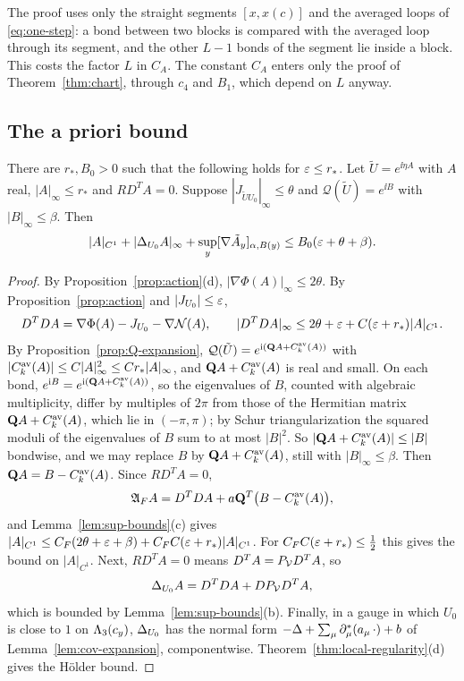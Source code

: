 The proof uses only the straight segments $[x,x(c)]$ and the averaged loops of \eqref{eq:one-step}: a bond between two blocks is compared with the averaged loop through its segment, and the other $L-1$ bonds of the segment lie inside a block. This costs the factor $L$ in $C_A$. The constant $C_A$ enters only the proof of Theorem~\ref{thm:chart}, through $c_4$ and $B_1$, which depend on $L$ anyway.

\subsection{The a priori bound}\label{ss:24.4}

\begin{proposition}\label{prop:a-priori}
There are $r_*,B_0>0$ such that the following holds for $\varepsilon\le r_*$. Let $\tilde U=e^{\ii\eta A}$ with $A$ real, $|A|_\infty\le r_*$ and $R D^TA=0$. Suppose $|J_{\tilde UU_0}|_\infty\le\theta$ and $\mathcal Q(\tilde U)=e^{\ii B}$ with $|B|_\infty\le\beta$. Then
\[
|A|_{C^1}+|\Delta_{U_0}A|_\infty+\sup_y[\nabla\tilde A_y]_{\alpha,B(y)}\le B_0(\varepsilon+\theta+\beta).
\]
\end{proposition}

\begin{proof}
By Proposition~\ref{prop:action}(d), $|\nabla\Phi(A)|_\infty\le2\theta$. By Proposition~\ref{prop:action} and $|J_{U_0}|\le\varepsilon$,
\[
D^TDA=\nabla\Phi(A)-J_{U_0}-\nabla\mathcal N(A),\qquad|D^TDA|_\infty\le2\theta+\varepsilon+C(\varepsilon+r_*)|A|_{C^1}.
\]
By Proposition~\ref{prop:Q-expansion}, $\mathcal Q(\tilde U)=e^{\mathrm i(\mathbf Q A+C^{\rm av}_k(A))}$ with $|C^{\rm av}_k(A)|\le C|A|_\infty^2\le Cr_*|A|_\infty$, and $\mathbf Q A+C^{\rm av}_k(A)$ is real and small. On each bond, $e^{\mathrm i B}=e^{\mathrm i(\mathbf Q A+C^{\rm av}_k(A))}$, so the eigenvalues of $B$, counted with algebraic multiplicity, differ by multiples of $2\pi$ from those of the Hermitian matrix $\mathbf Q A+C^{\rm av}_k(A)$, which lie in $(-\pi,\pi)$; by Schur triangularization the squared moduli of the eigenvalues of $B$ sum to at most $|B|^2$. So $|\mathbf Q A+C^{\rm av}_k(A)|\le|B|$ bondwise, and we may replace $B$ by $\mathbf Q A+C^{\rm av}_k(A)$, still with $|B|_\infty\le\beta$. Then $\mathbf Q A=B-C^{\rm av}_k(A)$. Since $RD^TA=0$,
\[
\mathfrak A_FA=D^TDA+a\mathbf Q^T\big(B-C^{\rm av}_k(A)\big),
\]
and Lemma~\ref{lem:sup-bounds}(c) gives $|A|_{C^1}\le C_F(2\theta+\varepsilon+\beta)+C_FC(\varepsilon+r_*)|A|_{C^1}$. For $C_FC(\varepsilon+r_*)\le\frac12$ this gives the bound on $|A|_{C^1}$. Next, $RD^TA=0$ means $D^TA=P_\mathcal V D^TA$, so
\[
\Delta_{U_0}A=D^TDA+DP_\mathcal V D^TA,
\]
which is bounded by Lemma~\ref{lem:sup-bounds}(b). Finally, in a gauge in which $U_0$ is close to $1$ on $\Lambda_3(c_y)$, $\Delta_{U_0}$ has the normal form $-\Delta+\sum_\mu\partial^*_\mu(a_\mu\,\cdot)+b$ of Lemma~\ref{lem:cov-expansion}, componentwise. Theorem~\ref{thm:local-regularity}(d) gives the H\"older bound.
\end{proof}

